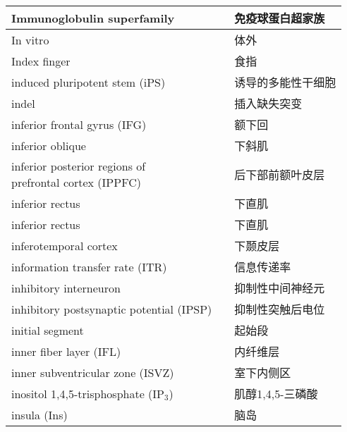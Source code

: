 \begin{longtable}{lll}
	\midrule
	Immunoglobulin superfamily   && 免疫球蛋白超家族  \\
	
	\midrule
	In vitro   && 体外  \\
	
	\midrule
	Index finger  && 食指  \\
	
	\midrule
	induced pluripotent stem (iPS)  && 诱导的多能性干细胞  \\
	
	\midrule
	indel   && 插入缺失突变  \\
	
	\midrule
	inferior frontal gyrus (IFG)   && 额下回  \\
	
	\midrule
	inferior oblique   && 下斜肌  \\
	
	\midrule
	\makecell{inferior posterior regions of \\ prefrontal cortex (IPPFC)}  && 后下部前额叶皮层  \\
	
	\midrule
	inferior rectus   && 下直肌  \\
	
	\midrule
	inferior rectus   && 下直肌  \\
	
	\midrule
	inferotemporal cortex   && 下颞皮层  \\
	
	\midrule
	information transfer rate (ITR)   && 信息传递率  \\
	
	\midrule
	inhibitory interneuron  && 抑制性中间神经元  \\
	
	\midrule
	inhibitory postsynaptic potential (IPSP)  && 抑制性突触后电位  \\
	
	\midrule
	initial segment && 起始段  \\
	
	\midrule
	inner fiber layer (IFL)   && 内纤维层  \\
	
	\midrule
	inner subventricular zone (ISVZ)   && 室下内侧区  \\
	
	\midrule
	inositol 1,4,5-trisphosphate  (IP$_3$) && 肌醇1,4,5-三磷酸  \\
	
	\midrule
	insula (Ins)   && 脑岛  \\
	

\end{longtable}
